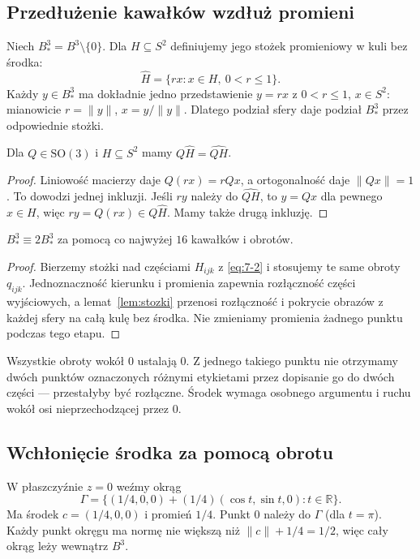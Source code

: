 \subsection{Przedłużenie kawałków wzdłuż promieni}
Niech $B^3_*=B^3\setminus\{0\}$. Dla $H\subseteq S^2$ definiujemy jego stożek promieniowy w kuli bez środka:
\[
 \widehat H=\{rx:x\in H,\ 0<r\le1\}.
\]
Każdy $y\in B^3_*$ ma dokładnie jedno przedstawienie $y=rx$ z $0<r\le1$, $x\in S^2$: mianowicie $r=\|y\|$, $x=y/\|y\|$. Dlatego podział sfery daje podział $B^3_*$ przez odpowiednie stożki.
\begin{lemat}\label{lem:stozki}
Dla $Q\in\mathrm{SO}(3)$ i $H\subseteq S^2$ mamy $Q\widehat H=\widehat{QH}$.
\end{lemat}
\begin{proof}
Liniowość macierzy daje $Q(rx)=rQx$, a ortogonalność daje $\|Qx\|=1$. To dowodzi jednej inkluzji. Jeśli $ry$ należy do $\widehat{QH}$, to $y=Qx$ dla pewnego $x\in H$, więc $ry=Q(rx)\in Q\widehat H$. Mamy także drugą inkluzję.
\end{proof}
\begin{wniosek}\label{wn:kula-bez-srodka}
$B^3_*\equiv2B^3_*$ za pomocą co najwyżej $16$ kawałków i obrotów.
\end{wniosek}
\begin{proof}
Bierzemy stożki nad częściami $H_{ijk}$ z \eqref{eq:7-2} i stosujemy te same obroty $q_{ijk}$. Jednoznaczność kierunku i promienia zapewnia rozłączność części wyjściowych, a lemat~\ref{lem:stozki} przenosi rozłączność i pokrycie obrazów z każdej sfery na całą kulę bez środka. Nie zmieniamy promienia żadnego punktu podczas tego etapu.
\end{proof}
\begin{uwaga}
Wszystkie obroty wokół $0$ ustalają $0$. Z jednego takiego punktu nie otrzymamy dwóch punktów oznaczonych różnymi etykietami przez dopisanie go do dwóch części --- przestałyby być rozłączne. Środek wymaga osobnego argumentu i ruchu wokół osi nieprzechodzącej przez $0$.
\end{uwaga}

\subsection{Wchłonięcie środka za pomocą obrotu}
W płaszczyźnie $z=0$ weźmy okrąg
\[
 \Gamma=\{(1/4,0,0)+(1/4)(\cos t,\sin t,0):t\in\mathbb R\}.
\]
Ma środek $c=(1/4,0,0)$ i promień $1/4$. Punkt $0$ należy do $\Gamma$ (dla $t=\pi$). Każdy punkt okręgu ma normę nie większą niż $\|c\|+1/4=1/2$, więc cały okrąg leży wewnątrz $B^3$.

